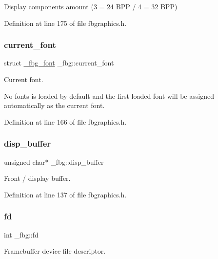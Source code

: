 Display components amount (3 = 24 B\+PP / 4 = 32 B\+PP) 



Definition at line 175 of file fbgraphics.\+h.

\mbox{\label{struct__fbg_a72868d703236aaabb7a5031703a6bbd8}} 
\subsubsection{\texorpdfstring{current\+\_\+font}{current\_font}}
{\footnotesize\ttfamily struct \mbox{\hyperlink{fbgraphics_8h_struct__fbg__font}{\+\_\+fbg\+\_\+font}} \+\_\+fbg\+::current\+\_\+font}



Current font. 

No fonts is loaded by default and the first loaded font will be assigned automatically as the current font. 

Definition at line 166 of file fbgraphics.\+h.

\mbox{\label{struct__fbg_aa20614c94c7235bc5bc105b6e71e1be8}} 
\subsubsection{\texorpdfstring{disp\+\_\+buffer}{disp\_buffer}}
{\footnotesize\ttfamily unsigned char$\ast$ \+\_\+fbg\+::disp\+\_\+buffer}



Front / display buffer. 



Definition at line 137 of file fbgraphics.\+h.

\mbox{\label{struct__fbg_acfa58132f44f89e832ae7f73f5583b7e}} 
\subsubsection{\texorpdfstring{fd}{fd}}
{\footnotesize\ttfamily int \+\_\+fbg\+::fd}



Framebuffer device file descriptor. 




